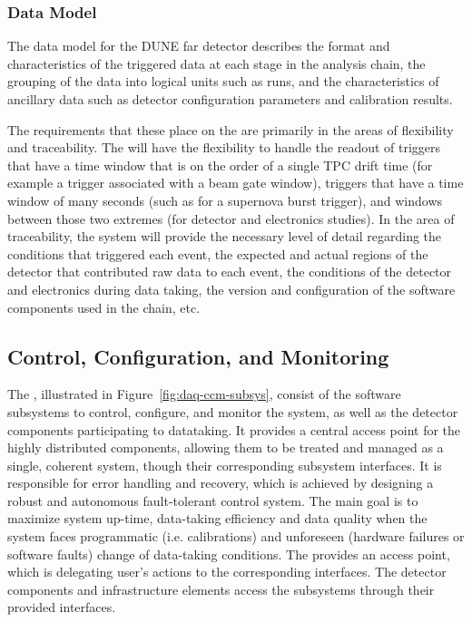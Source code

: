 \subsubsection{Data Model}
\label{sec:fd-daq:design-data-model}

The data model for the DUNE far detector describes the format and characteristics of the triggered data at each stage in the analysis chain, the grouping of the data into logical units such as runs, and the characteristics of ancillary data such as detector configuration parameters and calibration results.

The requirements that these place on the  are primarily in the areas of flexibility and traceability.  The  will have the flexibility to handle the readout of triggers that have a time window that is on the order of a single TPC drift time (for example a trigger associated with a beam gate window), triggers that have a time window of many seconds (such as for a supernova burst trigger), and windows between those two extremes (for detector and electronics studies).  In the area of traceability, the  system will provide the necessary level of detail regarding the conditions that triggered each event, the expected and actual regions of the detector that contributed raw data to each event, the conditions of the detector and electronics during data taking, the version and configuration of the software components used in the  chain, etc.

\subsection{Control, Configuration, and Monitoring}
\label{sec:fd-daq:design-run-control}

The , illustrated in Figure~\ref{fig:daq-ccm-subsys}, consist of the software
subsystems to control, configure, and monitor the  system, as well as the detector components
participating to datataking. It provides a central access point for the highly distributed 
components, allowing them to be treated and managed as a single, coherent system, though their
corresponding subsystem interfaces. It is responsible for error handling and recovery, which is
achieved by designing a robust and autonomous fault-tolerant control system. The main goal is to
maximize system up-time, data-taking efficiency and data quality when the system faces programmatic
(i.e. calibrations) and unforeseen (hardware failures or software faults) change of data-taking
conditions. The  provides an access point, which is delegating user's actions to the
corresponding interfaces. The detector components and infrastructure elements access the 
subsystems through their provided interfaces. 

